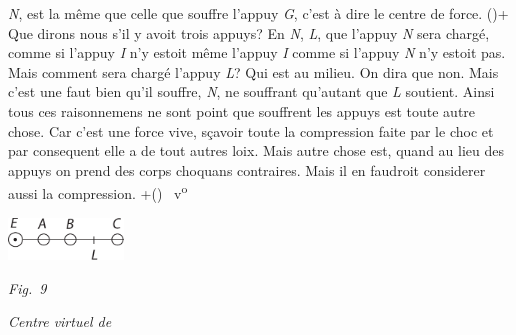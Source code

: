 %
\textit{N}, est la même que celle que souffre l'appuy \textit{G}, c'est à dire le centre de force.%
%
(\protect\vphantom)+ Que dirons nous s'il y avoit trois appuys? En \textit{N}, \textit{L},
%
%
que l'appuy \textit{N} sera chargé, comme si l'appuy \textit{I} n'y estoit
%
%
même l'appuy \textit{I} comme si l'appuy \textit{N} n'y estoit pas. 
%
Mais comment sera chargé l'appuy \textit{L}? Qui est au milieu. On dira que non. Mais c'est une
%
%
faut bien qu'il souffre, \textit{N}, ne souffrant qu'autant que \textit{L} soutient. Ainsi tous ces raisonnemens ne sont point
%
%
que souffrent les appuys est toute autre chose. Car c'est une force vive\protect{}, 
%
sçavoir toute la compression faite par le choc 
%
et par consequent elle a de tout autres loix. Mais autre chose est, quand au lieu des appuys 
%
on prend des corps choquans contraires. Mais il en faudroit considerer aussi la compression. +\protect\vphantom() 
~v\textsuperscript{o}\rbrack\ 
\pend
%
\vspace{1.5em}
\centerline{\includegraphics[width=0.23\textwidth]{gesamttex/edit_VIII,3/images/LH_38_212-215_d9_214v.pdf}}
\vspace{0.5em}
\centerline{\lbrack\textit{Fig.~9}\rbrack}
\vspace{1.0em}
%
%
\pstart 
{}
%
%
%
%
%
\textit{Centre virtuel de}
%
